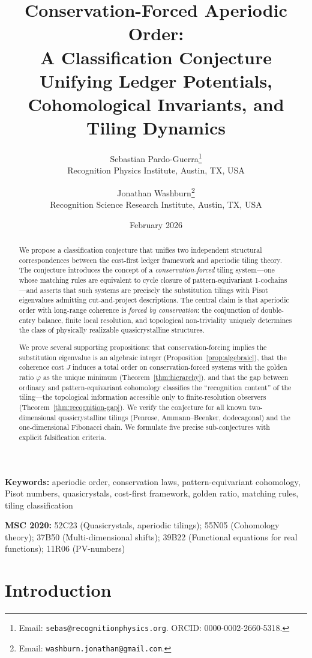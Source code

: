 \documentclass[12pt]{article}
\title{Conservation-Forced Aperiodic Order:\\A Classification Conjecture Unifying Ledger Potentials,\\Cohomological Invariants, and Tiling Dynamics}
\author{Sebastian Pardo-Guerra\thanks{Email: \texttt{sebas@recognitionphysics.org}. ORCID: 0000-0002-2660-5318.}\\[4pt]
\small Recognition Physics Institute, Austin, TX, USA
\and
Jonathan Washburn\thanks{Email: \texttt{washburn.jonathan@gmail.com}.}\\[4pt]
\small Recognition Science Research Institute, Austin, TX, USA}
\date{February 2026}
\theoremstyle{definition}
\theoremstyle{remark}
\begin{document}
\maketitle

\begin{abstract}
We propose a classification conjecture that unifies two independent structural correspondences between the cost-first ledger framework and aperiodic tiling theory. The conjecture introduces the concept of a \emph{conservation-forced} tiling system---one whose matching rules are equivalent to cycle closure of pattern-equivariant 1-cochains---and asserts that such systems are precisely the substitution tilings with Pisot eigenvalues admitting cut-and-project descriptions. The central claim is that aperiodic order with long-range coherence is \emph{forced by conservation}: the conjunction of double-entry balance, finite local resolution, and topological non-triviality uniquely determines the class of physically realizable quasicrystalline structures.

We prove several supporting propositions: that conservation-forcing implies the substitution eigenvalue is an algebraic integer (Proposition~\ref{prop:algebraic}), that the coherence cost $J$ induces a total order on conservation-forced systems with the golden ratio $\varphi$ as the unique minimum (Theorem~\ref{thm:hierarchy}), and that the gap between ordinary and pattern-equivariant cohomology classifies the ``recognition content'' of the tiling---the topological information accessible only to finite-resolution observers (Theorem~\ref{thm:recognition-gap}). We verify the conjecture for all known two-dimensional quasicrystalline tilings (Penrose, Ammann--Beenker, dodecagonal) and the one-dimensional Fibonacci chain. We formulate five precise sub-conjectures with explicit falsification criteria.
\end{abstract}

\medskip
\noindent\textbf{Keywords:} aperiodic order, conservation laws, pattern-equivariant cohomology, Pisot numbers, quasicrystals, cost-first framework, golden ratio, matching rules, tiling classification

\medskip
\noindent\textbf{MSC 2020:} 52C23 (Quasicrystals, aperiodic tilings); 55N05 (Cohomology theory); 37B50 (Multi-dimensional shifts); 39B22 (Functional equations for real functions); 11R06 (PV-numbers)

\section{Introduction}
\label{sec:introduction}
\end{document}
